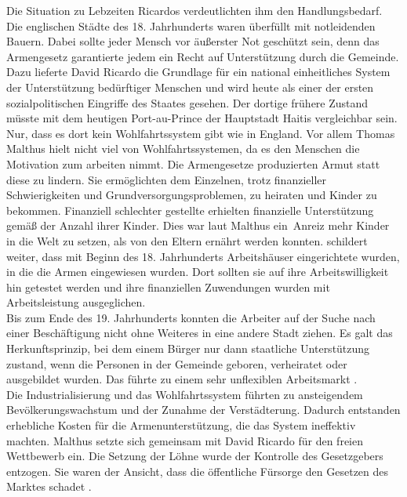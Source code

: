 %
 Die Situation zu Lebzeiten Ricardos verdeutlichten ihm den Handlungsbedarf. Die englischen Städte des 18. Jahrhunderts waren überfüllt mit notleidenden Bauern. Dabei sollte jeder Mensch vor äußerster Not geschützt sein, denn das Armengesetz garantierte jedem ein Recht auf Unterstützung durch die Gemeinde. Dazu lieferte David Ricardo die Grundlage für ein national einheitliches System der Unterstützung bedürftiger Menschen und wird heute als einer der ersten sozialpolitischen Eingriffe des Staates gesehen. Der dortige frühere Zustand müsste mit dem heutigen Port-au-Prince der Hauptstadt Haitis vergleichbar sein. Nur, dass es dort kein Wohlfahrtssystem gibt wie in England. Vor allem Thomas Malthus hielt nicht viel von Wohlfahrtssystemen, da es den Menschen die Motivation zum arbeiten nimmt. Die Armengesetze produzierten Armut statt diese zu lindern. Sie ermöglichten dem Einzelnen, trotz finanzieller Schwierigkeiten und Grundversorgungsproblemen, zu heiraten und Kinder zu bekommen. Finanziell schlechter gestellte erhielten finanzielle Unterstützung gemäß der Anzahl ihrer Kinder. Dies war laut Malthus ein~Anreiz mehr Kinder in die Welt zu setzen, als von den Eltern ernährt werden konnten. \cite{Lin.2007} schildert weiter, dass mit Beginn des 18. Jahrhunderts Arbeitshäuser eingerichtete wurden,  in die die Armen eingewiesen wurden. Dort sollten sie auf ihre Arbeitswilligkeit hin getestet werden und ihre finanziellen Zuwendungen wurden mit Arbeitsleistung ausgeglichen. \\
%
 Bis zum Ende des 19. Jahrhunderts konnten die Arbeiter auf der Suche nach einer Beschäftigung nicht ohne Weiteres in eine andere Stadt ziehen. Es galt das Herkunftsprinzip, bei dem einem Bürger nur dann staatliche Unterstützung zustand, wenn die Personen in der Gemeinde geboren, verheiratet oder ausgebildet wurden. Das führte zu einem sehr unflexiblen Arbeitsmarkt \cite[S. 511]{Wende.2001,Hesse.2001}.\\
%
 Die Industrialisierung und das Wohlfahrtssystem führten zu ansteigendem Bevölkerungswachstum und der Zunahme der Verstädterung. Dadurch entstanden erhebliche Kosten für die Armenunterstützung, die das System ineffektiv machten. Malthus setzte sich gemeinsam mit David Ricardo für den freien Wettbewerb ein. Die Setzung der Löhne wurde der Kontrolle des Gesetzgebers entzogen. Sie waren der Ansicht, dass die öffentliche Fürsorge den Gesetzen des Marktes schadet \cite[Kapitel 4]{Baek.2010,Fischer.1972}.\\
%
